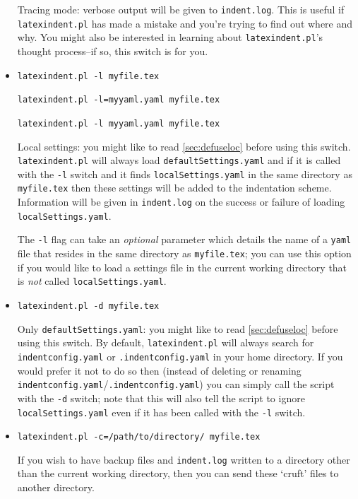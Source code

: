 \documentclass[11pt]{article}
\newcommand{\verbitem}[1]{\small\PVerb{#1}}
\begin{document}
\begin{itemize}[labelsep=.25cm]
	      \label{page:traceswitch}
	      Tracing mode: verbose output will be given to \lstinline!indent.log!. This
	      is useful if \lstinline!latexindent.pl! has made a mistake and you're
	      trying to find out where and why. You might also be interested in learning
	      about \lstinline!latexindent.pl!'s thought process--if so, this
	      switch is for you.
	\item[\verbitem{-l, --local[=myyaml.yaml]}] \lstinline!latexindent.pl -l myfile.tex!

\lstinline!latexindent.pl -l=myyaml.yaml myfile.tex!

\lstinline!latexindent.pl -l myyaml.yaml myfile.tex!


	      \label{page:localswitch}
	      Local settings: you might like to read \cref{sec:defuseloc} before
	      using this switch. \lstinline!latexindent.pl! will always load \lstinline!defaultSettings.yaml!
	      and if it is called with the \lstinline!-l! switch and it finds \lstinline!localSettings.yaml!
	      in the same directory as \lstinline!myfile.tex! then these settings will be
	      added to the indentation scheme. Information will be given in \lstinline!indent.log! on
	      the success or failure of loading \lstinline!localSettings.yaml!.

The \lstinline!-l! flag can take an \emph{optional} parameter which details the name of a \lstinline!yaml! file
that resides in the same directory as \lstinline!myfile.tex!; you can use this option if you would 
like to load a settings file in the current working directory that is \emph{not} called \lstinline!localSettings.yaml!.

	\item[\verbitem{-d, --onlydefault}] \lstinline!latexindent.pl -d myfile.tex!

	      Only \lstinline!defaultSettings.yaml!: you might like to read \cref{sec:defuseloc} before
	      using this switch. By default, \lstinline!latexindent.pl! will always search for
	      \lstinline!indentconfig.yaml! or \lstinline!.indentconfig.yaml!  in your home directory. If you would prefer it not to do so
	      then (instead of deleting or renaming \lstinline!indentconfig.yaml!/\lstinline!.indentconfig.yaml!) you can simply
	      call the script with the \lstinline!-d! switch; note that this will also tell
	      the script to ignore \lstinline!localSettings.yaml! even if it has been called with the
	      \lstinline!-l! switch.

	\item[\verbitem{-c, --cruft=<directory>}]\lstinline!latexindent.pl -c=/path/to/directory/ myfile.tex!

	      If you wish to have backup files and \lstinline!indent.log! written to a directory
	      other than the current working directory, then you can send these `cruft' files
	      to another directory.
\end{itemize}
\end{document}
